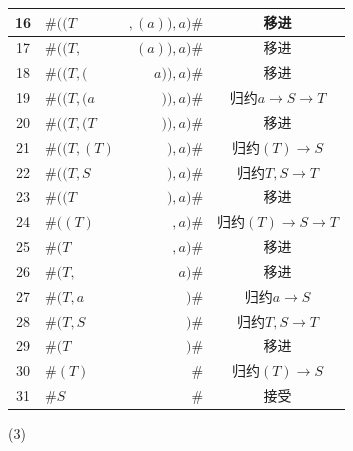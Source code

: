 \documentclass{article}
\begin{document}
\begin{center}
\begin{longtable}{|c|l|r|c|}
        16   & $\#((T$         & $,(a)),a)\#$                & 移进                                 \\\hline
        17   & $\#((T,$        & $(a)),a)\#$                 & 移进                                 \\\hline
        18   & $\#((T,($       & $a)),a)\#$                  & 移进                                 \\\hline
        19   & $\#((T,(a$      & $)),a)\#$                   & 归约$a \rightarrow S \rightarrow T$  \\\hline
        20   & $\#((T,(T$      & $)),a)\#$                   & 移进                                 \\\hline
        21   & $\#((T,(T)$     & $),a)\#$                    & 归约$(T) \rightarrow S$              \\\hline
        22   & $\#((T,S$       & $),a)\#$                    & 归约$T,S\rightarrow T$               \\\hline
        23   & $\#((T$         & $),a)\#$                    & 移进                                 \\\hline
        24   & $\#((T)$        & $,a)\#$                     & 归约$(T)\rightarrow S \rightarrow T$ \\\hline
        25   & $\#(T$          & $,a)\#$                     & 移进                                 \\\hline
        26   & $\#(T,$         & $a)\#$                      & 移进                                 \\\hline
        27   & $\#(T,a$        & $)\#$                       & 归约$a \rightarrow S$                \\\hline
        28   & $\#(T,S$        & $)\#$                       & 归约$T,S \rightarrow T$              \\\hline
        29   & $\#(T$          & $)\#$                       & 移进                                 \\\hline
        30   & $\#(T)$         & $\#$                        & 归约$(T) \rightarrow S$              \\\hline
        31   & $\#S$           & $\#$                        & 接受                                 \\\hline
    \end{longtable}
\end{center}
\vspace{-1cm}
(3)\vspace{-1cm}
\end{document}
